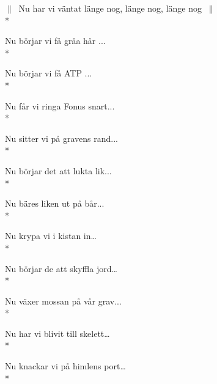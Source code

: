 \begin{SongText}
    \begin{SongVerse}
        $\|\:$ Nu har vi väntat länge nog, länge nog, länge nog $\:\|$\\*%
    \end{SongVerse}
    \begin{SongVerse}
        Nu börjar vi få gråa hår ...\\*%
    \end{SongVerse}
    \begin{SongVerse}
        Nu börjar vi få ATP ...\\*%
    \end{SongVerse}
    \begin{SongVerse}
        Nu får vi ringa Fonus snart...\\*%
    \end{SongVerse}
    \begin{SongVerse}
        Nu sitter vi på gravens rand...\\*%
    \end{SongVerse}
    \begin{SongVerse}
        Nu börjar det att lukta lik...\\*%
    \end{SongVerse}
    \begin{SongVerse}
        Nu bäres liken ut på bår...\\*%
    \end{SongVerse}
    \begin{SongVerse}
        Nu krypa vi i kistan in…\\*%
    \end{SongVerse}
    \begin{SongVerse}
        Nu börjar de att skyffla jord…\\*%
    \end{SongVerse}
    \begin{SongVerse}
        Nu växer mossan på vår grav...\\*%
    \end{SongVerse}
    \begin{SongVerse}
        Nu har vi blivit till skelett…\\*%
    \end{SongVerse}
    \begin{SongVerse}
        Nu knackar vi på himlens port…\\*%
    \end{SongVerse}
    \begin{SongVerse}

\end{SongVerse}
\end{SongText}
